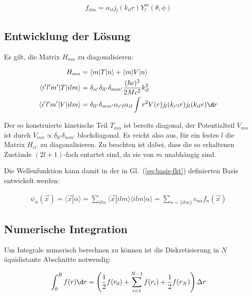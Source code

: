 \begin{align}
  \label{eq:basis-fkt}
  f_{i l m} = \alpha_{i l} j_l(k_{i l} r) Y_l^m(\theta, \phi)
\end{align}

\subsection{Entwicklung der Lösung}
\label{sec:entwicklung}

Es gilt, die Matrix $H_{m n}$ zu diagonalisieren:

\begin{align}
  H_{m n} &= \langle m | T | n \rangle + \langle m | V | n \rangle \\
  \langle i' l' m' | T | i l m \rangle &= \delta_{i i'} \delta_{l l'}
  \delta_{m m'} \frac{(\hbar c)^2}{2 M c^2} k_{i l}^2 \\
  \langle i' l' m' | V | i l m \rangle &= \delta_{l l'} \delta_{m m'}
  \alpha_{i'l} \alpha_{i l} \int r^2 V(r) j_l(k_{i' l} r) j_l(k_{i l}
  r) \d r
\end{align}

Der so konstruierte kinetische Teil $T_{m n}$ ist bereits diagonal,
der Potentialteil $V_{m n}$ ist durch $V_{m n} \propto \delta_{l l'}
\delta_{m m'}$ blockdiagonal. Es reicht also aus, für ein festes $l$
die Matrix $H_{i i'}$ zu diagonalisieren. Zu beachten ist dabei, dass
die so erhaltenen Zustände $(2 l + 1)$-fach entartet sind, da sie von
$m$ unabhängig sind.

Die Wellenfunktion kann damit in der in Gl.~(\ref{eq:basis-fkt})
definierten Basis entwickelt werden:

\begin{align}
  \psi_\alpha (\vec x) = \langle \vec x | \alpha \rangle =
  \sum_{i l m} \langle \vec x | i l m \rangle \langle i l m | \alpha
  \rangle = \sum_{n = \{i l m \}} c_{n \alpha} f_n(\vec x)
\end{align}


\subsection{Numerische Integration}
\label{sec:num-int}

Um Integrale numerisch berechnen zu können ist die Diskretisierung in
$N$ äquidistante Abschnitte notwendig:

\begin{align}
  \int_0^R f(r) \d r = \left(
    \frac{1}{2} f(r_0) + \sum_{i = 1}^{N-1} f(r_i) + \frac{1}{2}
    f(r_N)
  \right) \Delta r
\end{align}

